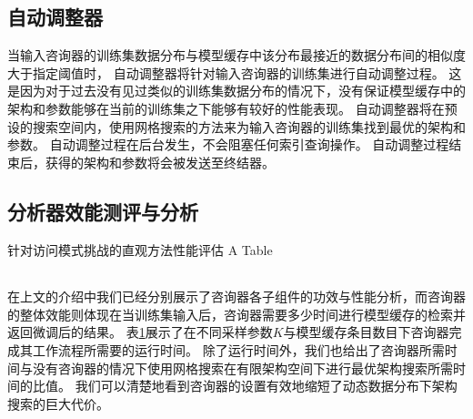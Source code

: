 
\subsection{自动调整器}

当输入咨询器的训练集数据分布与模型缓存中该分布最接近的数据分布间的相似度大于指定阈值时，
自动调整器将针对输入咨询器的训练集进行自动调整过程。
这是因为对于过去没有见过类似的训练集数据分布的情况下，没有保证模型缓存中的{\rmi}架构和参数能够在当前的训练集之下能够有较好的性能表现。
自动调整器将在预设的搜索空间内，使用网格搜索的方法来为输入咨询器的训练集找到最优的{\rmi}架构和参数。
自动调整过程在后台发生，不会阻塞任何索引查询操作。
自动调整过程结束后，获得的{\rmi}架构和参数将会被发送至终结器。


\subsection{分析器效能测评与分析}

\begin{table}[!hpb]
  \centering
  \bicaption[指向一个表格的表目录索引]
    {针对访问模式挑战的直观方法性能评估}
    {A Table}
  \label{tab:counselor}
  \begin{tabular}{@{}llr@{}} \toprule
  \end{tabular}
\end{table}

在上文的介绍中我们已经分别展示了咨询器各子组件的功效与性能分析，而咨询器的整体效能则体现在当训练集输入后，咨询器需要多少时间进行模型缓存的检索并返回微调后的结果。
表\ref{tab:counselor}展示了在不同采样参数$K$与模型缓存条目数目下咨询器完成其工作流程所需要的运行时间。
除了运行时间外，我们也给出了咨询器所需时间与没有咨询器的情况下使用网格搜索在有限架构空间下进行最优架构搜索所需时间的比值。
我们可以清楚地看到咨询器的设置有效地缩短了动态数据分布下架构搜索的巨大代价。


